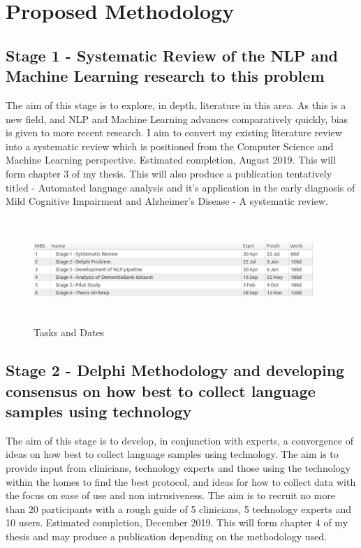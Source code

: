 \documentclass[11pt]{article}
\begin{document}
\section*{Proposed Methodology}
\subsection*{Stage 1 - Systematic Review of the NLP and Machine Learning research to this problem}
The aim of this stage is to explore, in depth, literature in this area. As this is a new field, and NLP and Machine Learning advances comparatively quickly, bias is given to more recent research. I aim to convert my existing literature review into a systematic review which is positioned from the Computer Science and Machine Learning perspective. Estimated completion, August 2019. This will form chapter 3 of my thesis. This will also produce a publication tentatively titled - Automated language analysis and it's application in the early diagnosis of Mild Cognitive Impairment and Alzheimer's Disease - A systematic review.

\begin{figure}[H]
\centering
\includegraphics[width=400px, height=150px]{images/TasksAndDates.png}
\caption{Tasks and Dates}
\end{figure}

\subsection*{Stage 2 - Delphi Methodology and developing consensus on how best to collect language samples using technology}
The aim of this stage is to develop, in conjunction with experts, a convergence of ideas on how best to collect language samples using technology. The aim is to provide input from clinicians, technology experts and those using the technology within the homes to find the best protocol, and ideas for how to collect data with the focus on ease of use and non intrusiveness. The aim is to recruit no more than 20 participants with a rough guide of 5 clinicians, 5 technology experts and 10 users. Estimated completion, December 2019. This will form chapter 4 of my thesis and may produce a publication depending on the methodology used. 
\end{document}

